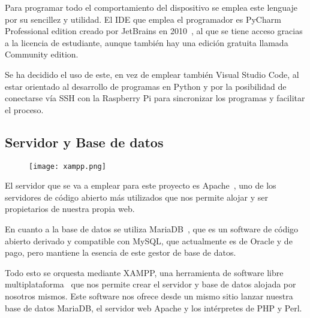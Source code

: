 Para programar todo el comportamiento del dispositivo se emplea este lenguaje por su sencillez y utilidad. El IDE que emplea el programador es PyCharm Professional edition creado por JetBrains en 2010~\cite{noauthor_pycharm_2021}, al que se tiene acceso gracias a la licencia de estudiante, aunque también hay una edición gratuita llamada Community edition.

Se ha decidido el uso de este, en vez de emplear también Visual Studio Code, al estar orientado al desarrollo de programas en Python y por la posibilidad de conectarse vía SSH con la Raspberry Pi para sincronizar los programas y facilitar el proceso.

\subsection{Servidor y Base de datos}\label{subsec:servidorDB}
\begin{figure}[H]
	{\texttt{[image: xampp.png]}}\label{fig:logoXAMPP}
\end{figure}
El servidor que se va a emplear para este proyecto es Apache~\cite{the_apache_software_foundation_apache_nodate}, uno de los servidores de código abierto más utilizados que nos permite alojar y ser propietarios de nuestra propia web.

En cuanto a la base de datos se utiliza MariaDB~\cite{mariadb_foundation_mariadb_nodate}, que es un software de código abierto derivado y compatible con MySQL, que actualmente es de Oracle y de pago, pero mantiene la esencia de este gestor de base de datos.

Todo esto se orquesta mediante XAMPP, una herramienta de software libre multiplataforma~\cite{vmware_xampp_nodate} que nos permite crear el servidor y base de datos alojada por nosotros mismos. Este software nos ofrece desde un mismo sitio lanzar nuestra base de datos MariaDB, el servidor web Apache y los intérpretes de PHP y Perl.